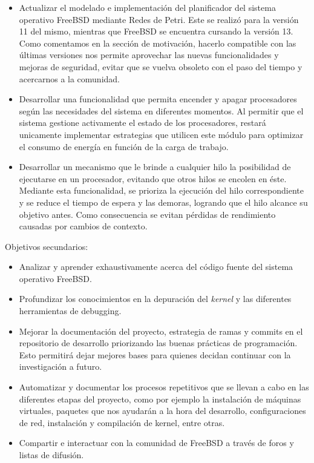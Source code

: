 \begin{itemize}
    \item Actualizar el modelado e implementación del planificador del sistema operativo FreeBSD mediante Redes de Petri. Este se realizó para la versión 11 del mismo, mientras que FreeBSD se encuentra cursando la versión 13. Como comentamos en la sección de motivación, hacerlo compatible con las últimas versiones nos permite aprovechar las nuevas funcionalidades y mejoras de seguridad, evitar que se vuelva obsoleto con el paso del tiempo y acercarnos a la comunidad.
    \item Desarrollar una funcionalidad que permita encender y apagar procesadores según las necesidades del sistema en diferentes momentos. Al permitir que el sistema gestione activamente el estado de los procesadores, restará unicamente implementar estrategias que utilicen este módulo para optimizar el consumo de energía en función de la carga de trabajo.
    \item Desarrollar un mecanismo que le brinde a cualquier hilo la posibilidad de ejecutarse en un procesador, evitando que otros hilos se encolen en éste. Mediante esta funcionalidad, se prioriza la ejecución del hilo correspondiente y se reduce el tiempo de espera y las demoras, logrando que el hilo alcance su objetivo antes. Como consecuencia se evitan pérdidas de rendimiento causadas por cambios de contexto.
\end{itemize}

Objetivos secundarios:

\begin{itemize}
    \item Analizar y aprender exhaustivamente acerca del código fuente del sistema operativo FreeBSD.\@
    \item Profundizar los conocimientos en la depuración del \textit{kernel} y las diferentes herramientas de debugging.
    \item Mejorar la documentación del proyecto, estrategia de ramas y commits en el repositorio de desarrollo priorizando las buenas prácticas de programación. Esto permitirá dejar mejores bases para quienes decidan continuar con la investigación a futuro.
    \item Automatizar y documentar los procesos repetitivos que se llevan a cabo en las diferentes etapas del proyecto, como por ejemplo la instalación de máquinas virtuales, paquetes que nos ayudarán a la hora del desarrollo, configuraciones de red, instalación y compilación de kernel, entre otras.
    \item Compartir e interactuar con la comunidad de FreeBSD a través de foros y listas de difusión.
\end{itemize}

